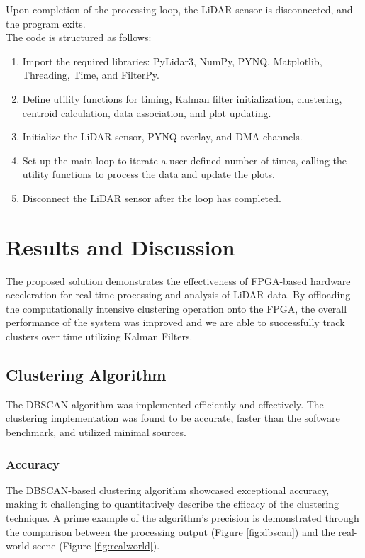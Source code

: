 \documentclass[journal]{IEEEtran} %
\begin{document}
Upon completion of the processing loop, the LiDAR sensor is disconnected, and the program exits.\\

The code is structured as follows:
\begin{enumerate}
\item Import the required libraries: PyLidar3, NumPy, PYNQ, Matplotlib, Threading, Time, and FilterPy.
\item Define utility functions for timing, Kalman filter initialization, clustering, centroid calculation, data association, and plot updating.
\item Initialize the LiDAR sensor, PYNQ overlay, and DMA channels.
\item Set up the main loop to iterate a user-defined number of times, calling the utility functions to process the data and update the plots.
\item Disconnect the LiDAR sensor after the loop has completed.
\end{enumerate}

\section{Results and Discussion}

The proposed solution demonstrates the effectiveness of FPGA-based hardware acceleration for real-time processing and analysis of LiDAR data. By offloading the computationally intensive clustering operation onto the FPGA, the overall performance of the system was improved and we are able to successfully track clusters over time utilizing Kalman Filters.

\subsection{Clustering Algorithm}
The DBSCAN algorithm was implemented efficiently and effectively. The clustering implementation was found to be accurate, faster than the software benchmark, and utilized minimal sources.\\

\subsubsection{Accuracy}
The DBSCAN-based clustering algorithm showcased exceptional accuracy, making it challenging to quantitatively describe the efficacy of the clustering technique. A prime example of the algorithm's precision is demonstrated through the comparison between the processing output (Figure \ref{fig:dbscan}) and the real-world scene (Figure \ref{fig:realworld}).
\end{document}
